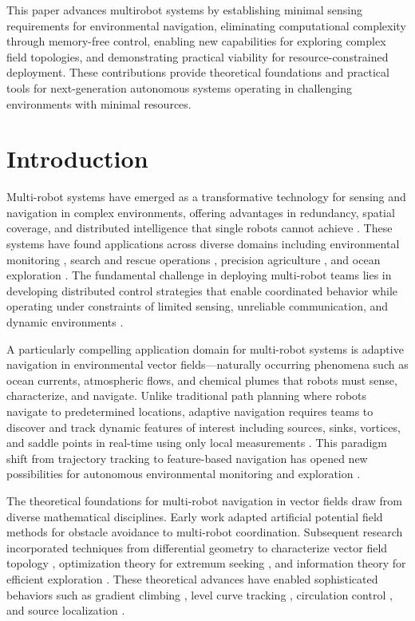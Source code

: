 \documentclass{article}
\begin{document}
This paper advances multirobot systems by establishing minimal sensing requirements for environmental navigation, eliminating computational complexity through memory-free control, enabling new capabilities for exploring complex field topologies, and demonstrating practical viability for resource-constrained deployment. These contributions provide theoretical foundations and practical tools for next-generation autonomous systems operating in challenging environments with minimal resources.


\section{Introduction}

Multi-robot systems have emerged as a transformative technology for sensing and navigation in complex environments, offering advantages in redundancy, spatial coverage, and distributed intelligence that single robots cannot achieve . These systems have found applications across diverse domains including environmental monitoring , search and rescue operations , precision agriculture , and ocean exploration . The fundamental challenge in deploying multi-robot teams lies in developing distributed control strategies that enable coordinated behavior while operating under constraints of limited sensing, unreliable communication, and dynamic environments .

A particularly compelling application domain for multi-robot systems is adaptive navigation in environmental vector fields—naturally occurring phenomena such as ocean currents, atmospheric flows, and chemical plumes that robots must sense, characterize, and navigate. Unlike traditional path planning where robots navigate to predetermined locations, adaptive navigation requires teams to discover and track dynamic features of interest including sources, sinks, vortices, and saddle points in real-time using only local measurements . This paradigm shift from trajectory tracking to feature-based navigation has opened new possibilities for autonomous environmental monitoring and exploration .

The theoretical foundations for multi-robot navigation in vector fields draw from diverse mathematical disciplines. Early work adapted artificial potential field methods for obstacle avoidance  to multi-robot coordination. Subsequent research incorporated techniques from differential geometry to characterize vector field topology , optimization theory for extremum seeking , and information theory for efficient exploration . These theoretical advances have enabled sophisticated behaviors such as gradient climbing , level curve tracking , circulation control , and source localization .
\end{document}
